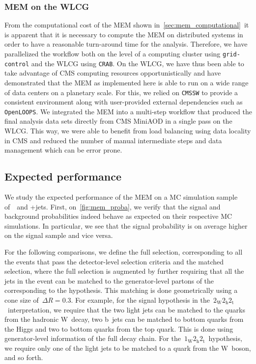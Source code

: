 \subsubsection{MEM on the WLCG}

From the computational cost of the MEM shown in~\cref{sec:mem_computational}~it is apparent that it is necessary to compute the MEM on distributed systems in order to have a reasonable turn-around time for the analysis. Therefore, we have parallelized the workflow both on the level of a computing cluster using \texttt{grid-control} and the WLCG using \texttt{CRAB}. On the WLCG, we have thus been able to take advantage of CMS computing resources opportunistically and have demonstrated that the MEM as implemented here is able to run on a wide range of data centers on a planetary scale. For this, we relied on \texttt{CMSSW} to provide a consistent environment along with user-provided external dependencies such as \texttt{OpenLOOPS}. We integrated the MEM into a multi-step workflow that produced the final analysis data sets directly from CMS MiniAOD in a single pass on the WLCG. This way, we were able to benefit from load balancing using data locality in CMS and reduced the number of manual intermediate steps and data management which can be error prone.

\subsection{Expected performance}
We study the expected performance of the MEM on a MC simulation sample of~\ttHbb~and \ttbar+jets. First, on~\cref{fig:mem_proba}, we verify that the signal and background probabilities indeed behave as expected on their respective MC simulations. In particular, we see that the signal probability is on average higher on the signal sample and vice versa.

For the following comparisons, we define the full selection, corresponding to all the events that pass the detector-level selection criteria and the matched selection, where the full selection is augmented by further requiring that all the jets in the event can be matched to the generator-level partons of the corresponding to the hypothesis. This matching is done geometrically using a cone size of~$\Delta R = 0.3$. For example, for the signal hypothesis in the~$2_{\mathrm{W}} 2_{\mathrm{h}} 2_{\mathrm{t}}$~interpretation, we require that the two light jets can be matched to the quarks from the hadronic W~decay, two b~jets can be matched to bottom quarks from the Higgs and two to bottom quarks from the top quark. This is done using generator-level information of the full decay chain. For the~$1_{\mathrm{W}} 2_{\mathrm{h}} 2_{\mathrm{t}}$~hypothesis, we require only one of the light jets to be matched to a quark from the W~boson, and so forth.

